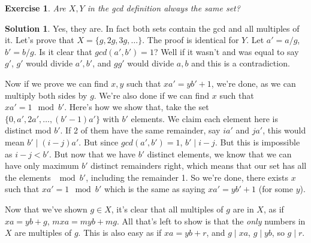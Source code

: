 \documentclass[a4paper,10pt]{article}
\newtheorem{exercise}{Exercise}[section]
\theoremstyle{definition} %
\newtheorem*{solution}{Solution}
\begin{document}
        \begin{exercise}
            Are $X, Y$ in the gcd definition always the same set?
        \end{exercise}
        \begin{solution}
            Yes, they are. In fact both sets contain the gcd and all multiples of it.
            Let's prove that $X = \{ g, 2g, 3g, \dots \}$. The proof is identical for $Y$.
            Let $a' = a/g$, $b' = b/g$. Is it clear that $gcd(a',b') = 1$? Well if it wasn't
            and was equal to say $g'$, $g'$ would divide $a', b'$, and $gg'$ would divide $a, b$
            and this is a contradiction.
            
            Now if we prove we can find $x,y$ such that $xa' = yb' + 1$, we're done, as we can multiply
            both sides by $g$. We're also done if we can find $x$ such that $xa' = 1 \mod b'$.
            Here's how we show that, take the set \\
            $\{ 0, a', 2a', \dots, (b'-1)a' \}$ with $b'$ elements. We claim each element here
            is distinct mod $b'$. If 2 of them have the same remainder, say $ia'$ and $ja'$, 
            this would mean $b' \mid (i-j)a'$. But since $gcd(a',b') = 1$, $b' \mid i-j$. But 
            this is impossible as $i-j < b'$. But now that we have $b'$ distinct elements, we know
            that we can have only maximum $b'$ distinct remainders right, which means that our set
            has all the elements $\mod b'$, including the remainder 1. So we're done, there
            exists $x$ such that $xa' = 1 \mod b'$ which is the same as saying $xa' = yb' + 1$
            (for some $y$).

            Now that we've shown $g \in X$, it's clear that all multiples of $g$ are in $X$,
            as if $xa = yb + g$, $mxa = myb + mg$. All that's left to show is that the \emph{only}
            numbers in $X$ are multiples of $g$. This is also easy as if $xa = yb + r$, and 
            $g \mid xa$, $g \mid yb$, so $g \mid r$.
        \end{solution}
\end{document}
